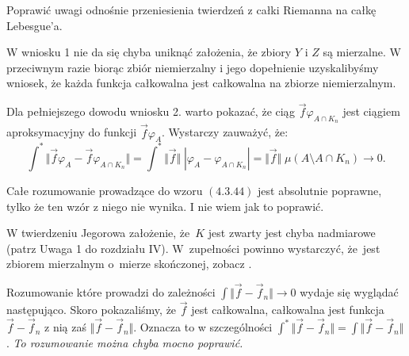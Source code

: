 \documentclass[a4paper,11pt]{article}
\begin{document}
\vspace{\spaceFour}


\start {} Poprawić uwagi odnośnie przeniesienia twierdzeń z
całki Riemanna na całkę Lebesgue’a.

\vspace{\spaceFour}


\start {} W wniosku 1 nie da się chyba uniknąć założenia, że
zbiory $Y$ i $Z$ są mierzalne. W przeciwnym razie biorąc zbiór
niemierzalny i jego dopełnienie uzyskalibyśmy wniosek, że każda
funkcja całkowalna jest całkowalna na zbiorze niemierzalnym.

\vspace{\spaceFour}


\start {} Dla pełniejszego dowodu wniosku 2. warto pokazać, że
ciąg $\vec{ f } \varphi_{ A \cap K_{ n } }$ jest ciągiem
aproksymacyjny do funkcji $\vec{ f } \varphi_{ A }$. Wystarczy
zauważyć, że:
\begin{equation}
  \label{eq:SchwartzKAMVolI-07}
  \int^{ * } \Vert \vec{ f } \varphi_{ A } - \vec{ f } \varphi_{ A \cap K_{ n } } \Vert
  = \int^{ * } \Vert \vec{ f } \Vert \; | \varphi_{ A } - \varphi_{ A \cap K_{ n } } |
  = \Vert \vec{ f } \Vert \; \mu( A \setminus A \cap K_{ n } ) \to 0.
\end{equation}

\start {} Całe rozumowanie prowadzące do wzoru $(4.3.44)$ jest
absolutnie poprawne, tylko że ten wzór z niego nie wynika. I nie wiem
jak to poprawić.

\vspace{\spaceFour}


\start {} W twierdzeniu Jegorowa założenie, że~$K$ jest zwarty
jest chyba nadmiarowe (patrz Uwaga 1 do rozdziału IV). W~zupełności
powinno wystarczyć, że~jest zbiorem mierzalnym o~mierze skończonej,
zobacz \cite{RudinAnalizaRzeczywistaIZespolona1998}.

\vspace{\spaceFour}


\start {} Rozumowanie które prowadzi do zależności
$\int \Vert \vec{ f } - \vec{ f }_{ n } \Vert \to 0$ wydaje się
wyglądać następująco. Skoro pokazaliśmy, że $\vec{ f }$ jest
całkowalna, całkowalna jest funkcja $\vec{ f } - \vec{ f }_{ n }$ z
nią zaś $\Vert \vec{ f } - \vec{ f }_{ n } \Vert$. Oznacza to w
szczególności
$\int^{ * } \Vert \vec{ f } - \vec{ f }_{ n } \Vert = \int \Vert \vec{
  f } - \vec{ f }_{ n } \Vert$. \textit{To rozumowanie można chyba mocno
  poprawić.}
\end{document}
